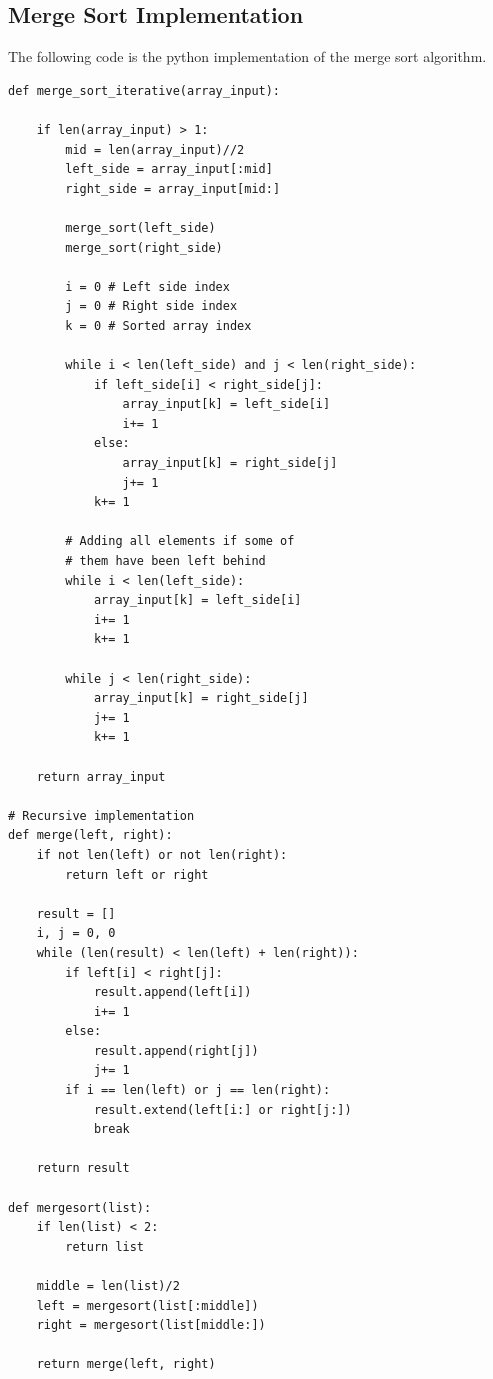 \subsection{Merge Sort Implementation}
The following code is the python implementation of the merge sort algorithm.
\begin{lstlisting}[firstnumber=1, caption={Merge Sort python implementation (for the recursive part credits: \href{https://www.geeksforgeeks.org/iterative-merge-sort/}{Merge Sort, GeeksforGeeks}).}]
def merge_sort_iterative(array_input):
	
	if len(array_input) > 1:
		mid = len(array_input)//2
		left_side = array_input[:mid]
		right_side = array_input[mid:]
		
		merge_sort(left_side)
		merge_sort(right_side)
		
		i = 0 # Left side index
		j = 0 # Right side index
		k = 0 # Sorted array index
		
		while i < len(left_side) and j < len(right_side):
			if left_side[i] < right_side[j]:
				array_input[k] = left_side[i]
				i+= 1
			else:
				array_input[k] = right_side[j]
				j+= 1
			k+= 1
			
		# Adding all elements if some of 
        # them have been left behind 
        while i < len(left_side): 
        	array_input[k] = left_side[i] 
            i+= 1
            k+= 1
            
        while j < len(right_side): 
        	array_input[k] = right_side[j] 
            j+= 1
            k+= 1
			
	return array_input
	
# Recursive implementation
def merge(left, right):
    if not len(left) or not len(right):
        return left or right
 
    result = []
    i, j = 0, 0
    while (len(result) < len(left) + len(right)):
        if left[i] < right[j]:
            result.append(left[i])
            i+= 1
        else:
            result.append(right[j])
            j+= 1
        if i == len(left) or j == len(right):
            result.extend(left[i:] or right[j:])
            break
 
    return result
 
def mergesort(list):
    if len(list) < 2:
        return list
 
    middle = len(list)/2
    left = mergesort(list[:middle])
    right = mergesort(list[middle:])
 
    return merge(left, right)
\end{lstlisting}

